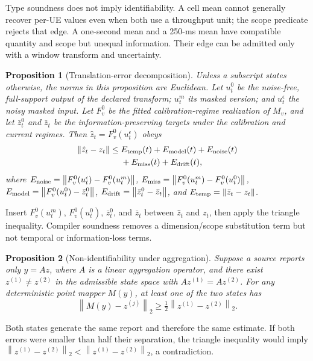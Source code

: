 \documentclass[10pt,journal,twoside]{IEEEtran}
\newtheorem{proposition}{Proposition}
\newcommand{\norm}[1]{\left\lVert #1\right\rVert}
\begin{document}
Type soundness does not imply identifiability. A cell mean cannot generally recover per-UE values even when both use a throughput unit; the scope predicate rejects that edge. A one-second mean and a 250-ms mean have compatible quantity and scope but unequal information. Their edge can be admitted only with a window transform and uncertainty.

\begin{proposition}[Translation-error decomposition]
Unless a subscript states otherwise, the norms in this proposition are Euclidean.
Let $u_t^0$ be the noise-free, full-support output of the declared transform; $u_t^m$ its masked version; and $u_t^\epsilon$ the noisy masked input. Let $F_v^0$ be the fitted calibration-regime realization of $M_v$, and let $\bar z_t^0$ and $\bar z_t$ be the information-preserving targets under the calibration and current regimes. Then $\hat z_t=F_v^0(u_t^\epsilon)$ obeys
\begin{equation}
\begin{aligned}
\norm{\hat z_t-z_t}\le{}&E_{\rm temp}(t)+E_{\rm model}(t)+E_{\rm noise}(t)\\
&+E_{\rm miss}(t)+E_{\rm drift}(t),
\end{aligned}
\label{eq:error-decomposition}
\end{equation}
where $E_{\rm noise}=\norm{F_v^0(u_t^\epsilon)-F_v^0(u_t^m)}$, $E_{\rm miss}=\norm{F_v^0(u_t^m)-F_v^0(u_t^0)}$, $E_{\rm model}=\norm{F_v^0(u_t^0)-\bar z_t^0}$, $E_{\rm drift}=\norm{\bar z_t^0-\bar z_t}$, and $E_{\rm temp}=\norm{\bar z_t-z_t}$.
\end{proposition}
\begin{IEEEproof}
Insert $F_v^0(u_t^m)$, $F_v^0(u_t^0)$, $\bar z_t^0$, and $\bar z_t$ between $\hat z_t$ and $z_t$, then apply the triangle inequality. Compiler soundness removes a dimension/scope substitution term but not temporal or information-loss terms.
\end{IEEEproof}

\begin{proposition}[Non-identifiability under aggregation]
Suppose a source reports only $y=A z$, where $A$ is a linear aggregation operator, and there exist $z^{(1)}\ne z^{(2)}$ in the admissible state space with $Az^{(1)}=Az^{(2)}$. For any deterministic point mapper $M(y)$, at least one of the two states has
\begin{equation}
\norm{M(y)-z^{(j)}}_2\ge \tfrac{1}{2}\norm{z^{(1)}-z^{(2)}}_2.
\label{eq:impossibility}
\end{equation}
\end{proposition}
\begin{IEEEproof}
Both states generate the same report and therefore the same estimate. If both errors were smaller than half their separation, the triangle inequality would imply $\norm{z^{(1)}-z^{(2)}}_2<\norm{z^{(1)}-z^{(2)}}_2$, a contradiction.
\end{IEEEproof}
\end{document}
